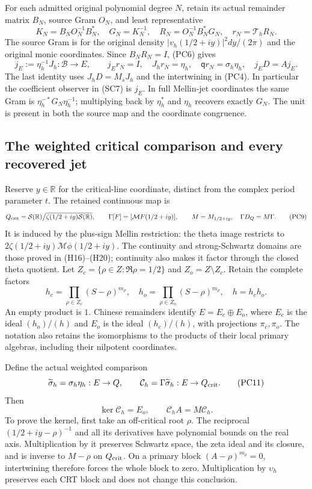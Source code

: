 \documentclass{article}
\begin{document}
For each admitted original polynomial degree $N$, retain its actual
remainder matrix $B_N$, source Gram $O_N$, and least representative
\[
 K_N=B_NO_N^{-1}B_N^*,\quad G_N=K_N^{-1},\quad
 R_N=O_N^{-1}B_N^*G_N,\quad r_N=\mathcal T_hR_N.
 \tag{PC7}
\]
The source Gram is for the original density
$|v_h(1/2+iy)|^2dy/(2\pi)$ and the original monic coordinates.
Since $B_NR_N=I$, (PC6) gives
\[
 j_E:=\eta_h^{-1}J_h:\mathscr B\to E,\qquad
 j_Er_N=I,\quad J_hr_N=\eta_h,\quad
 \mathsf q r_N=\sigma_h\eta_h,\quad j_ED=Aj_E.
 \tag{PC8}
\]
The last identity uses $J_hD=M_sJ_h$ and the intertwining in
(PC4).  In particular the coefficient observer in (SC7) is $j_E$.
In full Mellin-jet coordinates the same Gram is
$\eta_h^{-*}G_N\eta_h^{-1}$; multiplying back by $\eta_h^*$
and $\eta_h$ recovers exactly $G_N$.  The unit is present in both
the source map and the coordinate congruence.

\subsection{The weighted critical comparison and every recovered jet}

Reserve $y\in\mathbb R$ for the critical-line coordinate, distinct
from the complex period parameter $t$.  The retained continuous map is
\[
 Q_{\rm crit}=\mathcal S(\mathbb R)\big/
   \overline{\zeta(1/2+iy)\mathcal S(\mathbb R)},\qquad
 \Gamma[F]=[\mathcal MF(1/2+iy)],\qquad
 M=M_{1/2+iy},\quad \Gamma D_Q=M\Gamma.
 \tag{PC9}
\]
It is induced by the plus-sign Mellin restriction: the theta image
restricts to $2\zeta(1/2+iy)\mathcal M\phi(1/2+iy)$.
The continuity and strong-Schwartz domains are those proved in
(H16)--(H20); continuity also makes it factor through the closed
theta quotient.  Let $Z_c=\{\rho\in Z:\Re\rho=1/2\}$ and
$Z_o=Z\setminus Z_c$.  Retain the complete factors
\[
 h_c=\prod_{\rho\in Z_c}(S-\rho)^{m_\rho},\quad
 h_o=\prod_{\rho\in Z_o}(S-\rho)^{m_\rho},\quad h=h_ch_o.
 \tag{PC10}
\]
An empty product is $1$.  Chinese remainders identify
$E=E_c\oplus E_o$, where $E_c$ is the ideal $(h_o)/(h)$ and
$E_o$ is the ideal $(h_c)/(h)$, with projections $\pi_c,\pi_o$.
The notation also retains the isomorphisms to the products of their
local primary algebras, including their nilpotent coordinates.

Define the actual weighted comparison
\[
 \widetilde\sigma_h=\sigma_h\eta_h:E\to Q,\qquad
 \mathcal C_h=\Gamma\widetilde\sigma_h:E\to Q_{\rm crit}.
 \tag{PC11}
\]
Then
\[
 \boxed{\ker\mathcal C_h=E_o,\qquad
         \mathcal C_hA=M\mathcal C_h.}
 \tag{PC12}
\]
To prove the kernel, first take an off-critical root $\rho$.
The reciprocal $(1/2+iy-\rho)^{-1}$ and all its derivatives have
polynomial bounds on the real axis.  Multiplication by it preserves
Schwartz space, the zeta ideal and its closure, and is inverse to
$M-\rho$ on $Q_{\rm crit}$.  On a primary block
$(A-\rho)^{m_\rho}=0$, intertwining therefore forces the whole
block to zero.  Multiplication by $\upsilon_h$ preserves each CRT
block and does not change this conclusion.
\end{document}
